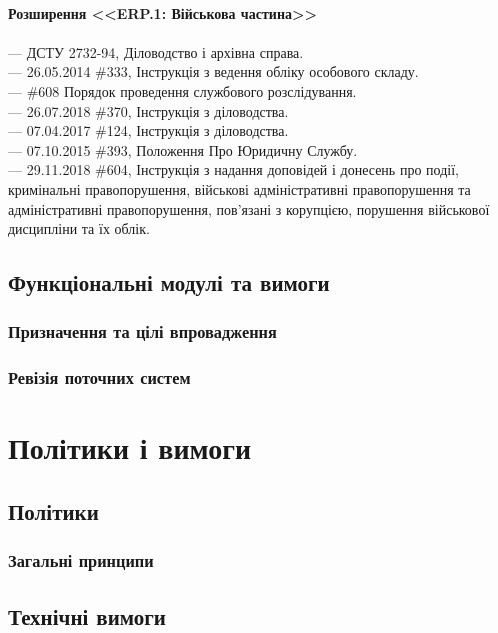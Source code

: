 \\
\newpage
{\bf Розширення <<ERP.1: Військова частина>>}
\\
\\
--- {ДСТУ 2732-94}, Діловодство і архівна справа. \\
--- {26.05.2014 \#333}, Інструкція з ведення обліку особового складу. \\
--- {\#608} Порядок проведення службового розслідування. \\
--- {26.07.2018 \#370}, Інструкція з діловодства. \\
--- {07.04.2017 \#124}, Інструкція з діловодства. \\
--- {07.10.2015 \#393}, Положення Про Юридичну Службу. \\
--- {29.11.2018 \#604}, Інструкція з надання доповідей і донесень про події,
                кримінальні правопорушення, військові адміністративні
                правопорушення та адміністративні правопорушення,
                пов'язані з корупцією, порушення військової дисципліни та їх облік. \\

\section{Функціональні модулі та вимоги}

\subsection{Призначення та цілі впровадження}

\subsection{Ревізія поточних систем}

\newpage
\chapter{Політики і вимоги}

\section{Політики}

\subsection{Загальні принципи}

\section{Технічні вимоги}

